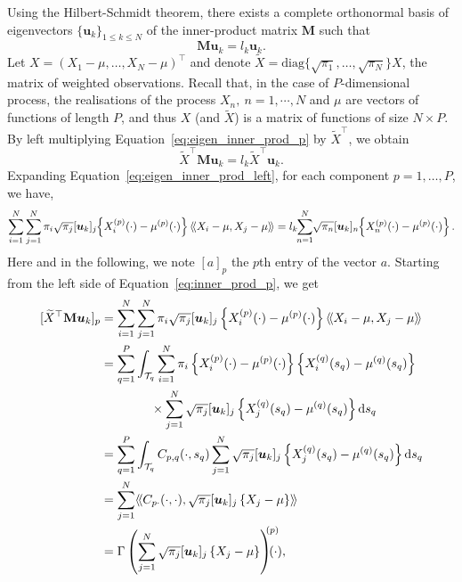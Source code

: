 Using the Hilbert-Schmidt theorem, there exists a complete orthonormal basis of eigenvectors $\{\boldsymbol{u}_k\}_{1 \leq k \leq N}$ of the inner-product matrix $\mathbf{M}$ such that
\begin{equation}\label{eq:eigen_inner_prod_p}
    \mathbf{M}\boldsymbol{u}_k = l_k\boldsymbol{u}_k.
\end{equation}
Let $X = \left(X_1 - \mu, \dots, X_N - \mu\right)^\top$ and denote $\widetilde{X} = \text{diag}\{\sqrt{\pi_1}, \dots, \sqrt{\pi_N}\}X$, the matrix of weighted observations. Recall that, in the case of $P$-dimensional process, the realisations of the process $X_n,~n = 1, \cdots, N$ and $\mu$ are vectors of functions of length $P$, and thus $X$ (and $\widetilde{X}$) is a matrix of functions of size $N \times P$. By left multiplying Equation~\eqref{eq:eigen_inner_prod_p} by $\widetilde{X}^\top$, we obtain
\begin{equation}\label{eq:eigen_inner_prod_left}
    \widetilde{X}^\top \mathbf{M} \boldsymbol{u}_k = l_k \widetilde{X}^\top \boldsymbol{u}_k.
\end{equation} 
Expanding Equation~\eqref{eq:eigen_inner_prod_left}, for each component $p = 1, \dots, P$, we have,
\begin{equation}\label{eq:inner_prod_p}
    \sum_{i = 1}^N \sum_{j = 1}^N \pi_i \sqrt{\pi_j}[\boldsymbol{u}_{k}]_j\mkern-4mu\left\{X_i^{(p)}(\cdot) - \mu^{(p)}(\cdot)\right\}\langle\!\langle X_i - \mu, X_j - \mu\rangle\!\rangle = l_k \mkern-5mu\sum_{n = 1}^N \mkern-4mu\sqrt{\pi_n}[\boldsymbol{u}_{k}]_n\mkern-4mu\left\{X_n^{(p)}(\cdot) - \mu^{(p)}(\cdot)\right\}.
\end{equation}
Here and in the following, we note $[a]_p$ the $p$th entry of the vector $a$. Starting from the left side of Equation~\eqref{eq:inner_prod_p}, we get
\begin{align}\label{eq:inner_prod_p_left}
[\widetilde{X}^\top \mathbf{M} \boldsymbol{u}_k]_p &= \sum_{i = 1}^N \sum_{j = 1}^N \pi_i \sqrt{\pi_j} [\boldsymbol{u}_{k}]_j \left\{X_i^{(p)}(\cdot) - \mu^{(p)}(\cdot)\right\}\inH{X_i - \mu}{X_j - \mu}\\
&= \sum_{q = 1}^P \int_{\TT{q}} \sum_{i = 1}^N \pi_i\left\{X_i^{(p)}(\cdot) - \mu^{(p)}(\cdot)\right\} \left\{X_i^{(q)}(s_q) - \mu^{(q)}(s_q)\right\}  \\
&\qquad\qquad \times \sum_{j = 1}^N \sqrt{\pi_j}[\boldsymbol{u}_{k}]_j \left\{X_j^{(q)}(s_q) - \mu^{(q)}(s_q)\right\} \dd s_q \\
&= \sum_{q = 1}^P \int_{\TT{q}} C_{p,q}(\cdot, s_q)\sum_{j = 1}^N \sqrt{\pi_j}[\boldsymbol{u}_{k}]_j \left\{X_j^{(q)}(s_q) - \mu^{(q)}(s_q)\right\} \dd s_q \\
&= \sum_{j = 1}^N \inH{C_{p \cdot}(\cdot, \cdot)}{\sqrt{\pi_j}[\boldsymbol{u}_{k}]_j \left\{X_j - \mu\right\}} \\
&= \Gamma\left(\sum_{j = 1}^N \sqrt{\pi_j}[\boldsymbol{u}_{k}]_j \left\{X_j - \mu\right\} \right)^{\mkern-9mu(p)}\mkern-18mu(\cdot),
\end{align}
